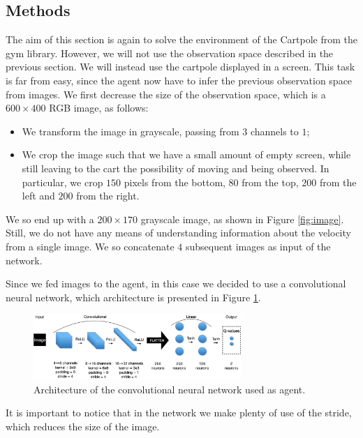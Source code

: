 \subsection{Methods}
The aim of this section is again to solve the environment of the Cartpole from the gym library. However, we will not use the 
observation space described in the previous section. We will instead use the cartpole displayed in a screen.
This task is far from easy, since the agent now have to infer the previous observation space from images. We first
decrease the size of the observation space, which is a $600\times400$ RGB image, as follows:
\begin{itemize}
    \item We transform the image in grayscale, passing from $3$ channels to $1$;
    \item We crop the image such that we have a small amount of empty screen, while still leaving to the cart the possibility
        of moving and being observed. In particular, we crop $150$ pixels from the bottom, $80$ from the top, $200$ from the left
        and $200$ from the right.
\end{itemize}
We so end up with a $200\times170$ grayscale image, as shown in Figure \ref{fig:image}. Still, we do not have any means of understanding
information about the velocity from a single image. We so concatenate $4$ subsequent images as input of the network. 

Since we fed images to the agent, in this case we decided to use a convolutional neural network, which architecture is presented in Figure
\ref{fig:conv}.
\begin{figure}[h]
    \centering
    \includegraphics[width=0.7\textwidth]{Images/conv.png}
    \caption{Architecture of the convolutional neural network used as agent.}
    \label{fig:conv}
\end{figure}
It is important to notice that in the network we make plenty of use of the stride, which reduces the size of the image.

